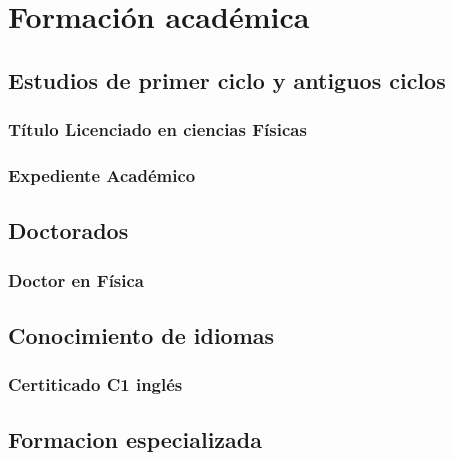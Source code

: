 \documentclass[a4paper, 11pt, twoside, openright]{report}
\begin{document}
\chapter{Formación académica}

\section{Estudios de primer ciclo y antiguos ciclos}
\subsection{Título Licenciado en ciencias Físicas}

\subsection{Expediente Académico}


\section{Doctorados}

\subsection{Doctor en Física}


\section{Conocimiento de idiomas}

\subsection{Certiticado C1 inglés}


\section{Formacion especializada}
\end{document}
